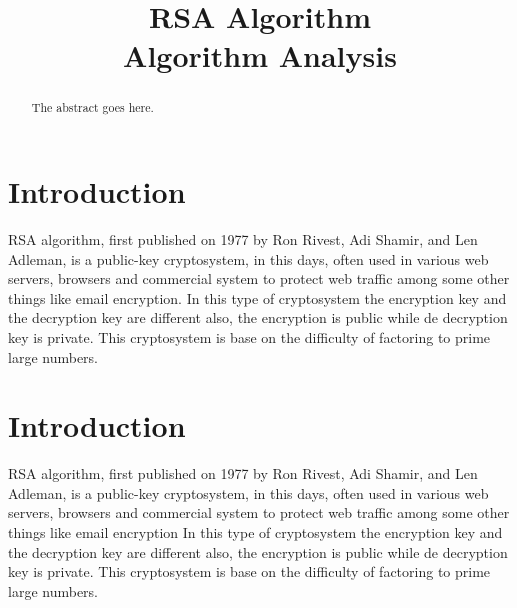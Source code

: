 \documentclass[conference,compsoc, 10pt]{IEEEtran}
\begin{document}
	

\title{RSA Algorithm\\ Algorithm Analysis}
\author{
\and
{}
\and
{}
}


\maketitle
\large
\begin{abstract}
	\large
	The abstract goes here.
\end{abstract}

\IEEEpeerreviewmaketitle


\section{Introduction}
RSA algorithm, first published on 1977 by Ron Rivest, Adi Shamir, and Len Adleman,  is a public-key cryptosystem, in this days, often used in various web servers, browsers and commercial system to protect web traffic among some other things like email encryption. In this type of cryptosystem the encryption key and the decryption key are different also, the encryption is public while de decryption key is private. This cryptosystem is base on the difficulty of factoring to prime large numbers.

\section[12pt]{Introduction}

RSA algorithm, first published on 1977 by Ron Rivest, Adi Shamir, and Len Adleman,  is a public-key cryptosystem, in this days, often used in various web servers, browsers and commercial system to protect web traffic among some other things like email encryption In this type of cryptosystem the encryption key and the decryption key are different also, the encryption is public while de decryption key is private. This cryptosystem is base on the difficulty of factoring to prime large numbers.
\end{document}

